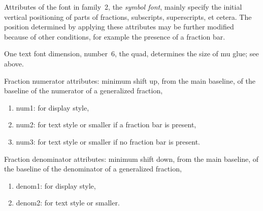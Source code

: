 Attributes of the font in family~2, the \emph{symbol font},
mainly specify the
initial vertical positioning
of parts of fractions, subscripts, superscripts, et cetera.
The position determined by applying these
attributes may be further modified because of other
conditions, for example the presence of a fraction bar.

One text font dimension, number~6,
the quad, determines the size of mu glue;
see above.

Fraction numerator attributes: minimum shift up, from
the main baseline, of the baseline of the numerator
of a generalized fraction,
\begin{enumerate} %
\item num1:
 for display style,
\item num2:
 for text style or smaller if a fraction bar is present,
\item num3:
 for text style or smaller if no fraction bar is present.
\end{enumerate}

Fraction denominator attributes: minimum shift down, from
the main baseline, of the baseline of the denominator
of a generalized fraction,
\begin{enumerate} %
\item denom1:
for display style,
\item denom2:
for text style or smaller.
\end{enumerate}

